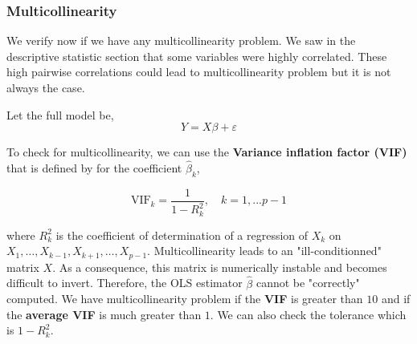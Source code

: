 \subsubsection{Multicollinearity}

We verify now if we have any multicollinearity problem. We saw in the descriptive statistic section that some variables were highly correlated. These high pairwise correlations could lead to multicollinearity problem but it is not always the case.

Let the full model be, 
\begin{equation}
	Y = X\beta + \varepsilon
\end{equation}

To check for multicollinearity, we can use the \textbf{Variance inflation factor (VIF)} that is defined by for the coefficient $\hat{\beta}_k$,

\begin{equation}
	\text{VIF}_k = \frac{1}{1 - R^2_k}, \quad k = 1,...p-1
\end{equation}

where $R^2_k$ is the coefficient of determination of a regression of $X_k$ on $X_1,\dots,X_{k-1},X_{k+1},\dots,X_{p-1}$. Multicollinearity leads to an "ill-conditionned" matrix $X$. As a consequence, this matrix is numerically instable and becomes difficult to invert. Therefore, the OLS estimator $\hat{\beta}$ cannot be "correctly" computed.
We have multicollinearity problem if the \textbf{VIF} is greater than $10$ and if the \textbf{average VIF} is much greater than $1$. We can also check the tolerance which is $1 - R^2_k$.



